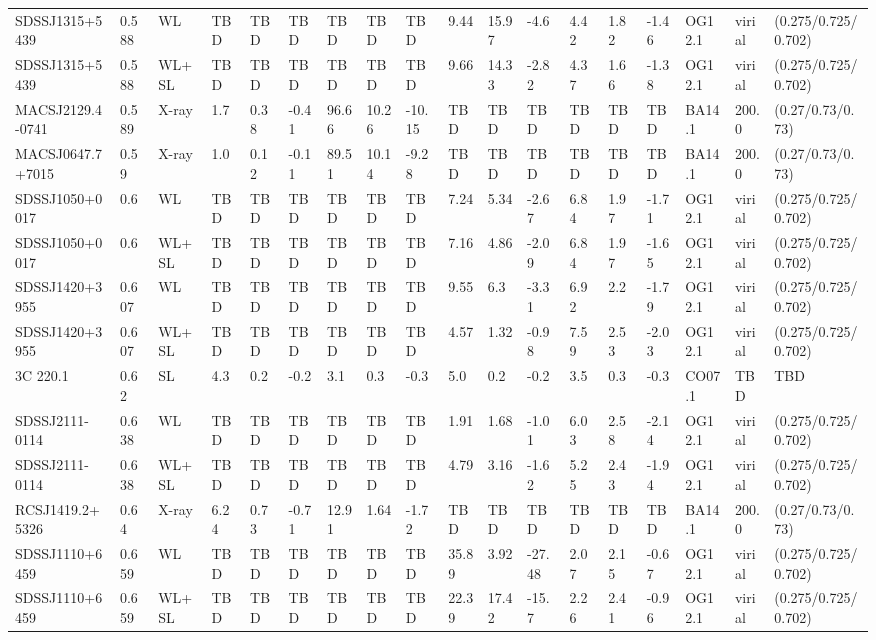 \documentclass{article}
\begin{document}
\begin{center}
\begin{landscape}
\begin{longtable}{llllllllllllllllll}
SDSSJ1315+5439 & 0.588 & WL & TBD & TBD & TBD & TBD & TBD & TBD & 9.44 & 15.97 & -4.6 & 4.42 & 1.82 & -1.46 & OG12.1 & virial & (0.275/0.725/0.702) \\
SDSSJ1315+5439 & 0.588 & WL+SL & TBD & TBD & TBD & TBD & TBD & TBD & 9.66 & 14.33 & -2.82 & 4.37 & 1.66 & -1.38 & OG12.1 & virial & (0.275/0.725/0.702) \\
MACSJ2129.4-0741 & 0.589 & X-ray & 1.7 & 0.38 & -0.41 & 96.66 & 10.26 & -10.15 & TBD & TBD & TBD & TBD & TBD & TBD & BA14.1 & 200.0 & (0.27/0.73/0.73) \\
MACSJ0647.7+7015 & 0.59 & X-ray & 1.0 & 0.12 & -0.11 & 89.51 & 10.14 & -9.28 & TBD & TBD & TBD & TBD & TBD & TBD & BA14.1 & 200.0 & (0.27/0.73/0.73) \\
SDSSJ1050+0017 & 0.6 & WL & TBD & TBD & TBD & TBD & TBD & TBD & 7.24 & 5.34 & -2.67 & 6.84 & 1.97 & -1.71 & OG12.1 & virial & (0.275/0.725/0.702) \\
SDSSJ1050+0017 & 0.6 & WL+SL & TBD & TBD & TBD & TBD & TBD & TBD & 7.16 & 4.86 & -2.09 & 6.84 & 1.97 & -1.65 & OG12.1 & virial & (0.275/0.725/0.702) \\
SDSSJ1420+3955 & 0.607 & WL & TBD & TBD & TBD & TBD & TBD & TBD & 9.55 & 6.3 & -3.31 & 6.92 & 2.2 & -1.79 & OG12.1 & virial & (0.275/0.725/0.702) \\
SDSSJ1420+3955 & 0.607 & WL+SL & TBD & TBD & TBD & TBD & TBD & TBD & 4.57 & 1.32 & -0.98 & 7.59 & 2.53 & -2.03 & OG12.1 & virial & (0.275/0.725/0.702) \\
3C 220.1 & 0.62 & SL & 4.3 & 0.2 & -0.2 & 3.1 & 0.3 & -0.3 & 5.0 & 0.2 & -0.2 & 3.5 & 0.3 & -0.3 & CO07.1 & TBD & TBD \\
SDSSJ2111-0114 & 0.638 & WL & TBD & TBD & TBD & TBD & TBD & TBD & 1.91 & 1.68 & -1.01 & 6.03 & 2.58 & -2.14 & OG12.1 & virial & (0.275/0.725/0.702) \\
SDSSJ2111-0114 & 0.638 & WL+SL & TBD & TBD & TBD & TBD & TBD & TBD & 4.79 & 3.16 & -1.62 & 5.25 & 2.43 & -1.94 & OG12.1 & virial & (0.275/0.725/0.702) \\
RCSJ1419.2+5326 & 0.64 & X-ray & 6.24 & 0.73 & -0.71 & 12.91 & 1.64 & -1.72 & TBD & TBD & TBD & TBD & TBD & TBD & BA14.1 & 200.0 & (0.27/0.73/0.73) \\
SDSSJ1110+6459 & 0.659 & WL & TBD & TBD & TBD & TBD & TBD & TBD & 35.89 & 3.92 & -27.48 & 2.07 & 2.15 & -0.67 & OG12.1 & virial & (0.275/0.725/0.702) \\
SDSSJ1110+6459 & 0.659 & WL+SL & TBD & TBD & TBD & TBD & TBD & TBD & 22.39 & 17.42 & -15.7 & 2.26 & 2.41 & -0.96 & OG12.1 & virial & (0.275/0.725/0.702) \\

\end{longtable}
\end{landscape}
\end{center}
\end{document}
